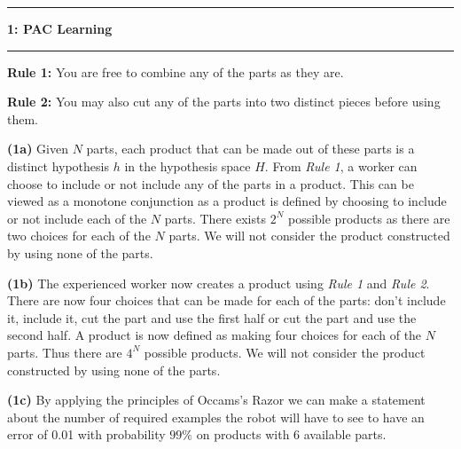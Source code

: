 \documentclass[11pt]{article}
\newcommand\question[2]{\vspace{.25in}\hrule\textbf{#1: #2}\vspace{.5em}\hrule\vspace{.10in}}
\renewcommand\part[1]{\vspace{.10in}\textbf{(#1)}}
\begin{document}
\raggedright
\newcommand\NAME{Jake Pitkin}  %
\newcommand\UID{u0891770}     %
\newcommand\HWNUM{4}              %

\question{1}{PAC Learning}

\textbf{Rule 1:} You are free to combine any of the parts as they are.

\textbf{Rule 2:} You may also cut any of the parts into two distinct pieces before using them.

\part{1a} Given $N$ parts, each product that can be made out of these parts is a distinct hypothesis $h$ in the hypothesis space $H$. From \textit{Rule 1}, a worker can choose to include or not include any of the parts in a product. This can be viewed as a monotone conjunction as a product is defined by choosing to include or not include each of the $N$ parts. There exists $2^N$ possible products as there are two choices for each of the $N$ parts. We will not consider the product constructed by using none of the parts.
	

\part{1b} The experienced worker now creates a product using \textit{Rule 1} and \textit{Rule 2}. There are now four choices that can be made for each of the parts: don't include it, include it, cut the part and use the first half or cut the part and use the second half. A product is now defined as making four choices for each of the $N$ parts. Thus there are $4^N$ possible products. We will not consider the product constructed by using none of the parts.


\part{1c} By applying the principles of Occams's Razor we can make a statement about the number of required examples the robot will have to see to have an error of 0.01 with probability $99\%$ on products with 6 available parts.
\end{document}
